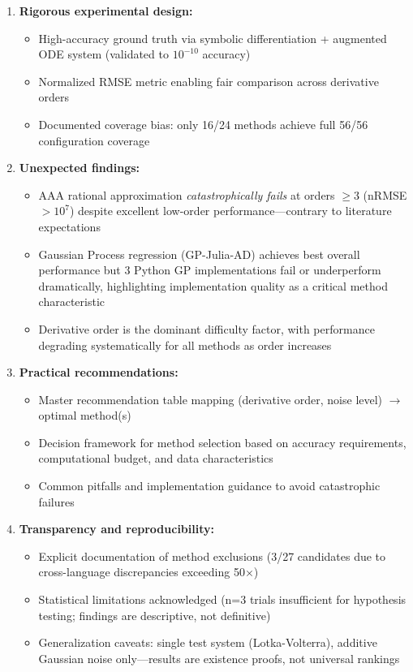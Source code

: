 \begin{enumerate}
    \item \textbf{Rigorous experimental design:} 
    \begin{itemize}
        \item High-accuracy ground truth via symbolic differentiation + augmented ODE system (validated to $10^{-10}$ accuracy)
        \item Normalized RMSE metric enabling fair comparison across derivative orders
        \item Documented coverage bias: only 16/24 methods achieve full 56/56 configuration coverage
    \end{itemize}
    
    \item \textbf{Unexpected findings:}
    \begin{itemize}
        \item AAA rational approximation \textit{catastrophically fails} at orders $\geq 3$ (nRMSE $> 10^7$) despite excellent low-order performance—contrary to literature expectations
        \item Gaussian Process regression (GP-Julia-AD) achieves best overall performance but 3 Python GP implementations fail or underperform dramatically, highlighting implementation quality as a critical method characteristic
        \item Derivative order is the dominant difficulty factor, with performance degrading systematically for all methods as order increases
    \end{itemize}
    
    \item \textbf{Practical recommendations:}
    \begin{itemize}
        \item Master recommendation table mapping (derivative order, noise level) $\to$ optimal method(s)
        \item Decision framework for method selection based on accuracy requirements, computational budget, and data characteristics
        \item Common pitfalls and implementation guidance to avoid catastrophic failures
    \end{itemize}
    
    \item \textbf{Transparency and reproducibility:}
    \begin{itemize}
        \item Explicit documentation of method exclusions (3/27 candidates due to cross-language discrepancies exceeding 50$\times$)
        \item Statistical limitations acknowledged (n=3 trials insufficient for hypothesis testing; findings are descriptive, not definitive)
        \item Generalization caveats: single test system (Lotka-Volterra), additive Gaussian noise only—results are existence proofs, not universal rankings
    \end{itemize}
\end{enumerate}


